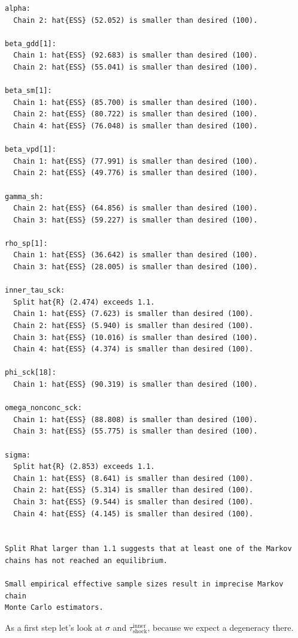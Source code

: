 \documentclass[
  letterpaper,
  DIV=11,
  numbers=noendperiod]{scrartcl}
\begin{document}
\begin{verbatim}
alpha:
  Chain 2: hat{ESS} (52.052) is smaller than desired (100).

beta_gdd[1]:
  Chain 1: hat{ESS} (92.683) is smaller than desired (100).
  Chain 2: hat{ESS} (55.041) is smaller than desired (100).

beta_sm[1]:
  Chain 1: hat{ESS} (85.700) is smaller than desired (100).
  Chain 2: hat{ESS} (80.722) is smaller than desired (100).
  Chain 4: hat{ESS} (76.048) is smaller than desired (100).

beta_vpd[1]:
  Chain 1: hat{ESS} (77.991) is smaller than desired (100).
  Chain 2: hat{ESS} (49.776) is smaller than desired (100).

gamma_sh:
  Chain 2: hat{ESS} (64.856) is smaller than desired (100).
  Chain 3: hat{ESS} (59.227) is smaller than desired (100).

rho_sp[1]:
  Chain 1: hat{ESS} (36.642) is smaller than desired (100).
  Chain 3: hat{ESS} (28.005) is smaller than desired (100).

inner_tau_sck:
  Split hat{R} (2.474) exceeds 1.1.
  Chain 1: hat{ESS} (7.623) is smaller than desired (100).
  Chain 2: hat{ESS} (5.940) is smaller than desired (100).
  Chain 3: hat{ESS} (10.016) is smaller than desired (100).
  Chain 4: hat{ESS} (4.374) is smaller than desired (100).

phi_sck[18]:
  Chain 1: hat{ESS} (90.319) is smaller than desired (100).

omega_nonconc_sck:
  Chain 1: hat{ESS} (88.808) is smaller than desired (100).
  Chain 3: hat{ESS} (55.775) is smaller than desired (100).

sigma:
  Split hat{R} (2.853) exceeds 1.1.
  Chain 1: hat{ESS} (8.641) is smaller than desired (100).
  Chain 2: hat{ESS} (5.314) is smaller than desired (100).
  Chain 3: hat{ESS} (9.544) is smaller than desired (100).
  Chain 4: hat{ESS} (4.145) is smaller than desired (100).


Split Rhat larger than 1.1 suggests that at least one of the Markov
chains has not reached an equilibrium.

Small empirical effective sample sizes result in imprecise Markov chain
Monte Carlo estimators.
\end{verbatim}

\linespread{2}

As a first step let's look at \(\sigma\) and
\(\tau^\text{inner}_\text{shock}\), because we expect a degeneracy
there.

\linespread{0.5}
\end{document}
